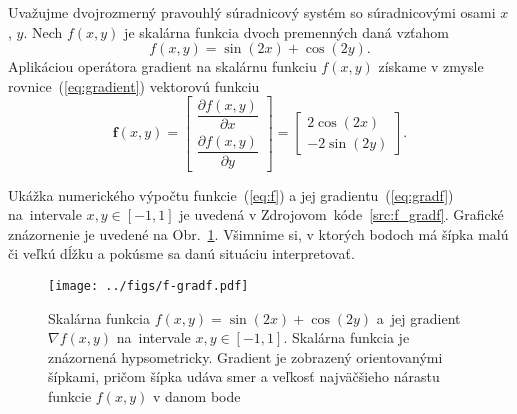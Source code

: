 \documentclass[a4paper, 12pt]{book}
\let\vec\mathbf
\begin{document}
Uvažujme dvojrozmerný pravouhlý súradnicový systém so súradnicovými osami $x$, 
$y$.  Nech $f(x, y)$ je skalárna funkcia dvoch premenných daná vzťahom
%
\begin{equation}
\label{eq:f}
f(x, y) = \sin(2x) + \cos(2y){.}
\end{equation}
%
Aplikáciou operátora gradient na skalárnu funkciu $f(x, y)$ získame v zmysle 
rovnice~(\ref{eq:gradient}) vektorovú funkciu
%
\begin{equation}
\label{eq:gradf}
\vec f(x, y) =
\begin{bmatrix}
\dfrac{\partial f(x, y)}{\partial x} \\[2ex]
\dfrac{\partial f(x, y)}{\partial y}
\end{bmatrix}
=
\begin{bmatrix}
2 \cos(2x) \\[2ex]
-2 \sin(2y)
\end{bmatrix}
{.}
\end{equation}

Ukážka numerického výpočtu funkcie~(\ref{eq:f}) a jej 
gradientu~(\ref{eq:gradf}) na~intervale $x, y \in [-1, 1]$ je uvedená 
v Zdrojovom~kóde~\ref{src:f_gradf}.  Grafické znázornenie je uvedené na 
Obr.~\ref{fig:f_gradf}.  Všimnime si, v ktorých bodoch má šípka malú či veľkú 
dĺžku a pokúsme sa danú situáciu interpretovať.



\begin{figure}[bt]
\centering
\texttt{[image: ../figs/f-gradf.pdf]}
\caption{Skalárna funkcia $f(x, y) = \sin(2x) + \cos(2y)$ a~jej gradient 
$\nabla f(x, y)$ na~intervale $x, y \in [-1, 1]$.  Skalárna funkcia je 
znázornená hypsometricky.  Gradient je zobrazený orientovanými šípkami, pričom 
šípka udáva smer a veľkosť najväčšieho nárastu funkcie $f(x, y)$ v danom bode}
\label{fig:f_gradf}
\end{figure}




\end{document}

